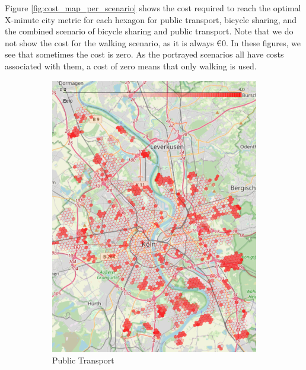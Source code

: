 Figure \ref{fig:cost_map_per_scenario} shows the cost required to reach the optimal X-minute city metric for each hexagon for public transport, bicycle sharing, and the combined scenario of bicycle sharing and public transport.
Note that we do not show the cost for the walking scenario, as it is always \euro{0}.
In these figures, we see that sometimes the cost is zero.
As the portrayed scenarios all have costs associated with them, a cost of zero means that only walking is used.
\begin{figure}
     \centering
     \begin{subfigure}[b]{0.3\textwidth}
         \centering
         \includegraphics[width=\textwidth]{Figures/results/cost/public_transport_cost_map}
         \caption{Public Transport}
         \label{fig:public_transport_cost_map}
     \end{subfigure}
     \hfill
     \begin{subfigure}[b]{0.3\textwidth}
         \centering

\end{subfigure}
\end{figure}
